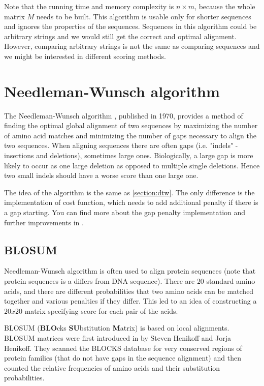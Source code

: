 Note that the running time and memory complexity is $n \times m$, because the whole matrix $M$ needs
to be built. This algorithm is usable only for shorter sequences and ignores the properties of the
sequences. Sequences in this algorithm could be arbitrary strings and we would still get the correct
and optimal alignment. However, comparing arbitrary strings is not the same as comparing sequences
and we might be interested in different scoring methods.

\section{Needleman-Wunsch algorithm}

The Needleman-Wunsch algorithm \cite{NEEDLEMAN1970443}, published in 1970, provides a method of
finding the optimal global alignment of two sequences by maximizing the number of amino acid matches
and minimizing the number of gaps necessary to align the two sequences. When aligning sequences
there are often gaps (i.e. "indels" - insertions and deletions), sometimes large ones. Biologically, a
large gap is more likely to occur as one large deletion as opposed to multiple single deletions.
Hence two small indels should have a worse score than one large one.

The idea of the algorithm is the same as \ref{section:dtw}. The only difference is the
implementation of cost function, which needs to add additional penalty if there is a gap starting.
You can find more about the gap penalty implementation and further improvements in
\cite{Boes2014ImprovingTN}.

\subsection{BLOSUM}

Needleman-Wunsch algorithm is often used to align protein sequences (note that protein sequences is
a differs from DNA sequence). There are $20$ standard amino acids, and there are different
probabilities that two amino acids can be matched together and various penalties if they differ.
This led to an idea of constructing a $20 x 20$ matrix specifying score for each pair of the acids. 

BLOSUM (\textbf{BLO}cks \textbf{SU}bstitution \textbf{M}atrix) is based on local alignments. BLOSUM
matrices were first introduced in by Steven Henikoff and Jorja Henikoff. They scanned the BLOCKS
database for very conserved regions of protein families (that do not have gaps in the sequence
alignment) and then counted the relative frequencies of amino acids and their substitution
probabilities.

